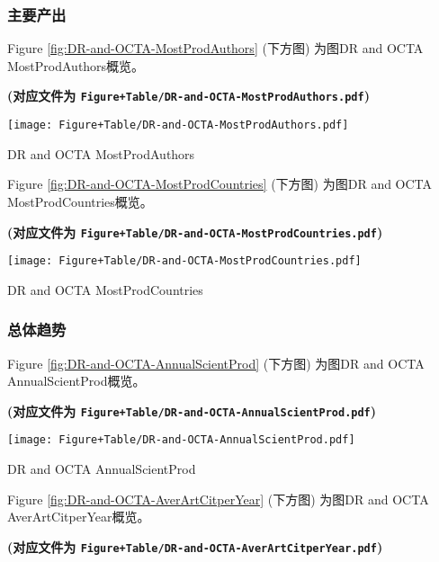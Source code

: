 \documentclass[
]{article}
\begin{document}
\hypertarget{ux4e3bux8981ux4ea7ux51fa}{%
\subsubsection{主要产出}\label{ux4e3bux8981ux4ea7ux51fa}}

Figure \ref{fig:DR-and-OCTA-MostProdAuthors} (下方图) 为图DR and OCTA MostProdAuthors概览。

\textbf{(对应文件为 \texttt{Figure+Table/DR-and-OCTA-MostProdAuthors.pdf})}

\def\@captype{figure}
\begin{center}
\texttt{[image: Figure+Table/DR-and-OCTA-MostProdAuthors.pdf]}
\caption{DR and OCTA MostProdAuthors}\label{fig:DR-and-OCTA-MostProdAuthors}
\end{center}

Figure \ref{fig:DR-and-OCTA-MostProdCountries} (下方图) 为图DR and OCTA MostProdCountries概览。

\textbf{(对应文件为 \texttt{Figure+Table/DR-and-OCTA-MostProdCountries.pdf})}

\def\@captype{figure}
\begin{center}
\texttt{[image: Figure+Table/DR-and-OCTA-MostProdCountries.pdf]}
\caption{DR and OCTA MostProdCountries}\label{fig:DR-and-OCTA-MostProdCountries}
\end{center}

\hypertarget{ux603bux4f53ux8d8bux52bf}{%
\subsubsection{总体趋势}\label{ux603bux4f53ux8d8bux52bf}}

Figure \ref{fig:DR-and-OCTA-AnnualScientProd} (下方图) 为图DR and OCTA AnnualScientProd概览。

\textbf{(对应文件为 \texttt{Figure+Table/DR-and-OCTA-AnnualScientProd.pdf})}

\def\@captype{figure}
\begin{center}
\texttt{[image: Figure+Table/DR-and-OCTA-AnnualScientProd.pdf]}
\caption{DR and OCTA AnnualScientProd}\label{fig:DR-and-OCTA-AnnualScientProd}
\end{center}

Figure \ref{fig:DR-and-OCTA-AverArtCitperYear} (下方图) 为图DR and OCTA AverArtCitperYear概览。

\textbf{(对应文件为 \texttt{Figure+Table/DR-and-OCTA-AverArtCitperYear.pdf})}
\end{document}
